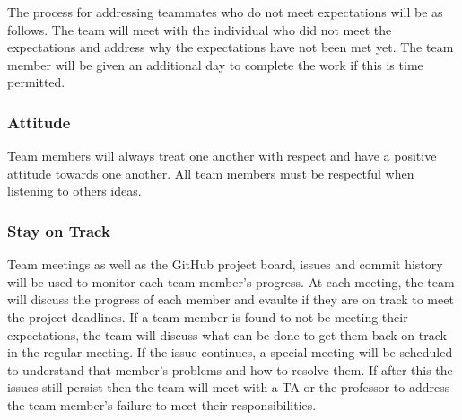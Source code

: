 \documentclass{article}
\begin{document}
The process for addressing teammates who do not meet expectations will be as follows. 
The team will meet with the individual who did not meet the expectations and address why the expectations have not been met yet.  
The team member will be given an additional day to complete the work if this is time permitted. 


\subsubsection*{Attitude}

Team members will always treat one another with respect and have a positive attitude towards one another. 
All team members must be respectful when listening to others ideas. 


\subsubsection*{Stay on Track}




\noindent Team meetings as well as the GitHub project board, issues and commit history will be used to monitor each team member's progress.
At each meeting, the team will discuss the progress of each member and evaulte if they are on track to meet the project deadlines.
If a team member is found to not be meeting their expectations, the team will discuss what can be done to get them back on track in the regular meeting.
If the issue continues, a special meeting will be scheduled to understand that member's problems and how to resolve them.
If after this the issues still persist then the team will meet with a TA or the professor to address the team member's failure to meet their responsibilities.
\end{document}
